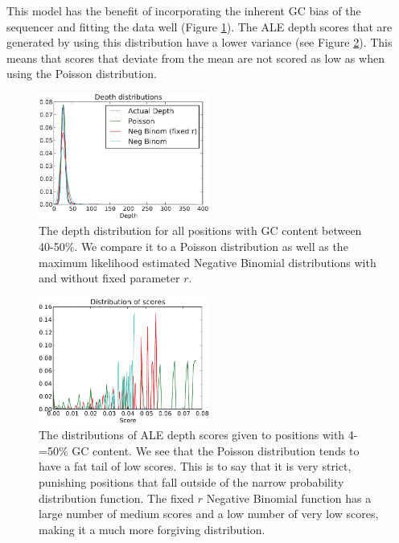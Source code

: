 \documentclass[phd,tocprelim]{cornell}
\begin{document}
This model has the benefit of incorporating the inherent GC bias of the sequencer and fitting the data well (Figure \ref{fig:GC4}). The ALE depth scores that are generated by using this distribution have a lower variance (see Figure \ref{fig:GC5}). This means that scores that deviate from the mean are not scored as low as when using the Poisson distribution.

\begin{figure}[hptb]
    \centerline{\includegraphics[width=0.5\textwidth]{figures/ALE/GC_depth_distributions.pdf}}
    \caption[Various distributions fit to GC content]{The depth distribution for all positions with GC content between 40-50\%. We compare it to a Poisson distribution as well as the maximum likelihood estimated Negative Binomial distributions with and without fixed parameter $r$.}\label{fig:GC4}
\end{figure}

\begin{figure}[hptb]
    \centerline{\includegraphics[width=0.5\textwidth]{figures/ALE/GC_depth_distribution_of_scores.pdf}}
    \caption[Distribution of scores using various distributions]{The distributions of ALE depth scores given to positions with 4-=50\% GC content. We see that the Poisson distribution tends to have a fat tail of low scores. This is to say that it is very strict, punishing positions that fall outside of the narrow probability distribution function. The fixed $r$ Negative Binomial function has a large number of medium scores and a low number of very low scores, making it a much more forgiving distribution.}\label{fig:GC5}
\end{figure}
\end{document}
